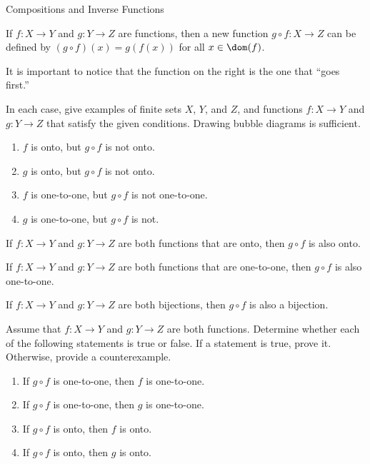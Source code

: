 \begin{section}{Compositions and Inverse Functions}

\begin{definition}
If $f:X\to Y$ and $g:Y\to Z$ are functions, then a new function $g\circ f:X\to Z$ can be defined by $(g\circ f)(x)=g(f(x))$ for all $x\in\dom(f)$.
\end{definition}

It is important to notice that the function on the right is the one that ``goes first.''

\begin{problem}
In each case, give examples of finite sets $X$, $Y$, and $Z$, and functions $f:X\to Y$ and $g:Y\to Z$ that satisfy the given conditions.  Drawing bubble diagrams is sufficient.
\begin{enumerate}[label=\textrm{(\alph*)}]
\item $f$ is onto, but $g\circ f$ is not onto.
\item $g$ is onto, but $g\circ f$ is not onto.
\item $f$ is one-to-one, but $g\circ f$ is not one-to-one.
\item $g$ is one-to-one, but $g\circ f$ is not.
\end{enumerate}
\end{problem}

\begin{theorem}
If $f:X\to Y$ and $g:Y\to Z$ are both functions that are onto, then $g\circ f$ is also onto.
\end{theorem}

\begin{theorem}
If $f:X\to Y$ and $g:Y\to Z$ are both functions that are one-to-one, then $g\circ f$ is also one-to-one.
\end{theorem}

\begin{corollary}
If $f:X\to Y$ and $g:Y\to Z$ are both bijections, then $g\circ f$ is also a bijection.
\end{corollary}

\begin{problem}
Assume that $f:X\to Y$ and $g:Y\to Z$ are both functions.  Determine whether each of the following statements is true or false. If a statement is true, prove it.  Otherwise, provide a counterexample.
\begin{enumerate}[label=\textrm{(\alph*)}]
\item If $g\circ f$ is one-to-one, then $f$ is one-to-one.
\item If $g\circ f$ is one-to-one, then $g$ is one-to-one.
\item If $g\circ f$ is onto, then $f$ is onto.
\item If $g\circ f$ is onto, then $g$ is onto.
\end{enumerate}
\end{problem}


\end{section}
